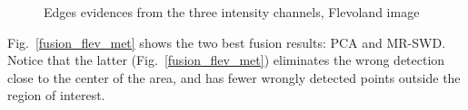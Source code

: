 \documentclass[journal]{IEEEtran}
\begin{document}
\begin{figure}[hbt]
	\centering
	\caption{Edges evidences from the three intensity channels, Flevoland image}
	\label{evidencias_flev_hh_hv_vv} 
\end{figure}

Fig.~\ref{fusion_flev_met} shows the two best fusion results: PCA and MR-SWD.
Notice that the latter (Fig.~\ref{fusion_flev_met}) eliminates the wrong detection close to the center of the area, and has fewer wrongly detected points outside the region of interest.
\end{document}
